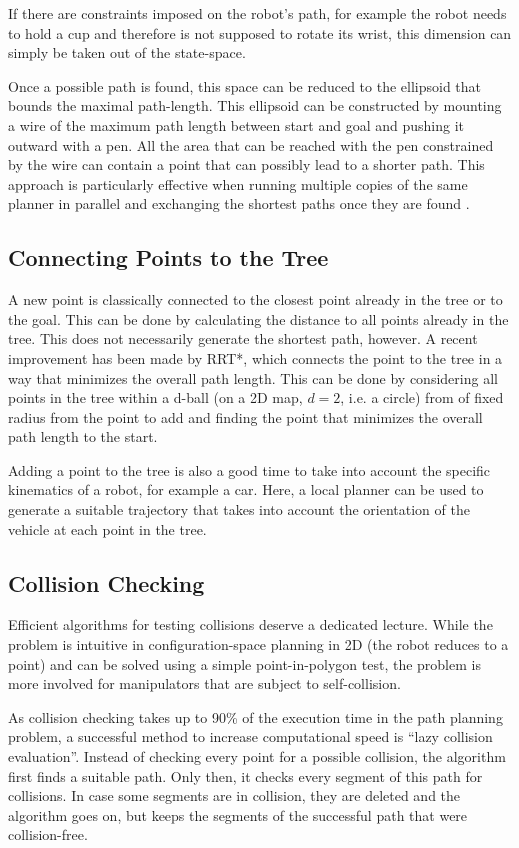 If there are constraints imposed on the robot's path, for example the robot needs to hold a cup and therefore is not supposed to rotate its wrist, this dimension can simply be taken out of the state-space.

Once a possible path is found, this space can be reduced to the ellipsoid that bounds the maximal path-length. This ellipsoid can be constructed by mounting a wire of the maximum path length between start and goal and pushing it outward with a pen. All the area that can be reached with the pen constrained by the wire can contain a point that can possibly lead to a shorter path. This approach is particularly effective when running multiple copies of the same planner in parallel and exchanging the shortest paths once they are found \cite{otte2012}.

\subsection{Connecting Points to the Tree}
A new point is classically connected to the closest point already in the tree or to the goal. This can be done by calculating the distance to all points already in the tree. This does not necessarily generate the shortest path, however. A recent improvement has been made by RRT*, which connects the point to the tree in a way that minimizes the overall path length. This can be done by considering all points in the tree within a d-ball (on a 2D map, $d=2$, i.e. a circle) from of fixed radius from the point to add and finding the point that minimizes the overall path length to the start.

Adding a point to the tree is also a good time to take into account the specific kinematics of a robot, for example a car. Here, a local planner can be used to generate a suitable trajectory that takes into account the orientation of the vehicle at each point in the tree.

\subsection{Collision Checking}
Efficient algorithms for testing collisions deserve a dedicated lecture. While the problem is intuitive in configuration-space planning in 2D (the robot reduces to a point) and can be solved using a simple point-in-polygon test, the problem is more involved for manipulators that are subject to self-collision.

As collision checking takes up to 90\% of the execution time in the path planning problem, a successful method to increase computational speed is ``lazy collision evaluation''. Instead of checking every point for a possible collision, the algorithm first finds a suitable path. Only then, it checks every segment of this path for collisions. In case some segments are in collision, they are deleted and the algorithm goes on, but keeps the segments of the successful path that were collision-free.

